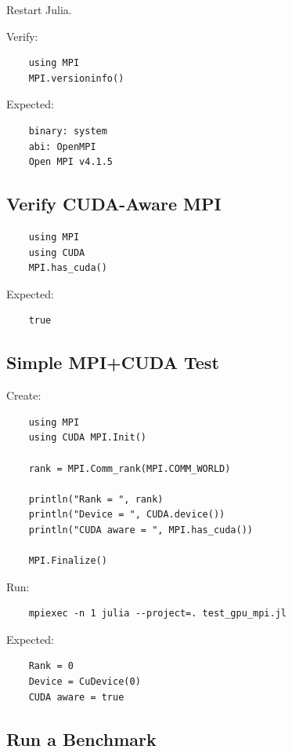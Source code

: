 Restart Julia. 

Verify: 

\begin{verbatim} 
    using MPI 
    MPI.versioninfo() 
\end{verbatim} 

Expected: 

\begin{verbatim} 
    binary: system 
    abi: OpenMPI 
    Open MPI v4.1.5 
\end{verbatim} 

\subsection{Verify CUDA-Aware MPI} 

\begin{verbatim} 
    using MPI 
    using CUDA 
    MPI.has_cuda() 
\end{verbatim} 

Expected: 

\begin{verbatim} 
    true 
\end{verbatim} 

\subsection{Simple MPI+CUDA Test} 

Create:

\begin{verbatim} 
    using MPI 
    using CUDA MPI.Init()

    rank = MPI.Comm_rank(MPI.COMM_WORLD) 

    println("Rank = ", rank) 
    println("Device = ", CUDA.device()) 
    println("CUDA aware = ", MPI.has_cuda()) 
    
    MPI.Finalize() 
\end{verbatim} 

Run: 

\begin{verbatim} 
    mpiexec -n 1 julia --project=. test_gpu_mpi.jl 
\end{verbatim} 

Expected: 

\begin{verbatim} 
    Rank = 0 
    Device = CuDevice(0) 
    CUDA aware = true 
\end{verbatim} 

\subsection{Run a Benchmark} 

